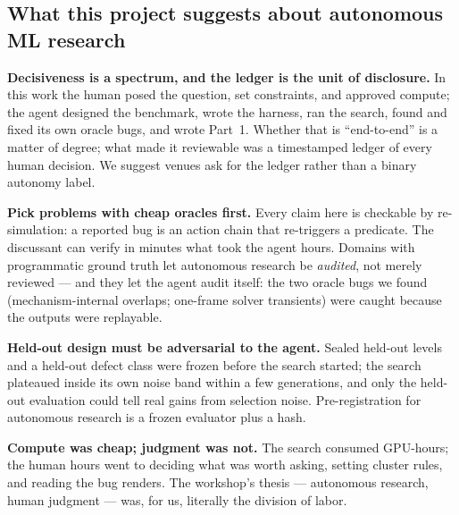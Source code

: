 \subsection*{What this project suggests about autonomous ML research}
\textbf{Decisiveness is a spectrum, and the ledger is the unit of disclosure.} In this work the human posed the question,
set constraints, and approved compute; the agent designed the benchmark, wrote the harness, ran the search, found and fixed its
own oracle bugs, and wrote Part~1. Whether that is ``end-to-end'' is a matter of degree; what made it reviewable was a timestamped
ledger of every human decision. We suggest venues ask for the ledger rather than a binary autonomy label.

\textbf{Pick problems with cheap oracles first.} Every claim here is checkable by re-simulation: a reported bug is an action chain
that re-triggers a predicate. The discussant can verify in minutes what took the agent hours. Domains with programmatic ground truth
let autonomous research be \emph{audited}, not merely reviewed --- and they let the agent audit itself: the two oracle bugs we found
(mechanism-internal overlaps; one-frame solver transients) were caught because the outputs were replayable.

\textbf{Held-out design must be adversarial to the agent.} Sealed held-out levels and a held-out defect class were frozen before the
search started; the search plateaued inside its own noise band within a few generations, and only the held-out evaluation could
tell real gains from selection noise. Pre-registration for autonomous research is a frozen evaluator plus a hash.

\textbf{Compute was cheap; judgment was not.} The search consumed GPU-hours; the human hours went to deciding what was worth asking,
setting cluster rules, and reading the bug renders. The workshop's thesis --- autonomous research, human judgment --- was, for us,
literally the division of labor.

